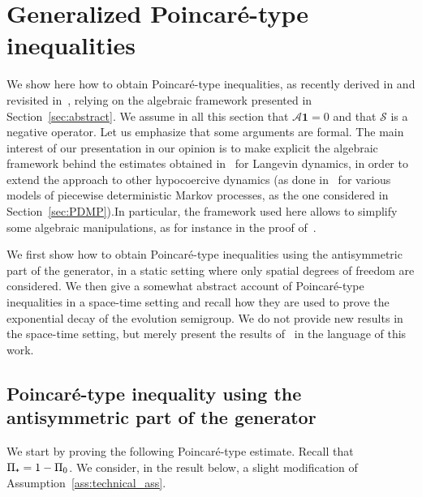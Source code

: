 \documentclass[AHL,Unicode,longabstracts,MathTools,published]{cedram}
\newcommand{\cLs}{\mathcal{S}}
\newcommand{\cLa}{\mathcal{A}}
\newcommand{\bfun}{\mathbf{1}}
\newcommand{\subplus}{\textnormal{\texttt{+}}}
\begin{document}
\appendix
\section{Generalized Poincaré-type inequalities}\label{sec:gen_Poincare}

We show here how to obtain Poincaré-type inequalities, as recently derived in \cite{AM19} and revisited in~\cite{CLW19}, relying on the algebraic framework presented in Section~\ref{sec:abstract}. We assume in all this section that $\cLa \bfun = 0$ and that $\cLs$ is a negative operator. Let us emphasize that some arguments are formal. The main interest of our presentation in our opinion is to make explicit the algebraic framework behind the estimates obtained in~\cite{AM19,CLW19} for Langevin dynamics, in order to extend the approach to other hypocoercive dynamics (as done in~\cite{LW20} for various models of piecewise deterministic Markov processes, as the one considered in Section~\ref{sec:PDMP}).\linebreak In particular, the framework used here allows to simplify some algebraic manipulations, as for instance in the proof of~\cite[Theorem~2]{CLW19}.

We first show how to obtain Poincaré-type inequalities using the antisymmetric part of the generator, in a static setting where only spatial degrees of freedom are considered. We then give a somewhat abstract account of Poincaré-type inequalities in a space-time setting and recall how they are used to prove the exponential decay of the evolution semigroup. We do not provide new results in the space-time setting, but merely present the results of~\cite{AM19,CLW19} in the language of this work.

\subsection{Poincaré-type inequality using the antisymmetric part of the generator}
We start by proving the following Poincaré-type estimate. Recall that $\Pi_\subplus = 1-\Pi_0$. We consider, in the result below, a slight modification of Assumption~\ref{ass:technical_ass}.
\end{document}
